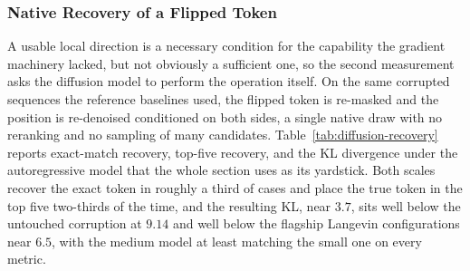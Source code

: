 \subsubsection{Native Recovery of a Flipped Token}
\label{sec:results-diffusion-recovery}

A usable local direction is a necessary condition for the capability the gradient machinery lacked, but not obviously a sufficient one, so the second measurement asks the diffusion model to perform the operation itself. On the same corrupted sequences the reference baselines used, the flipped token is re-masked and the position is re-denoised conditioned on both sides, a single native draw with no reranking and no sampling of many candidates. Table~\ref{tab:diffusion-recovery} reports exact-match recovery, top-five recovery, and the KL divergence under the autoregressive model that the whole section uses as its yardstick. Both scales recover the exact token in roughly a third of cases and place the true token in the top five two-thirds of the time, and the resulting KL, near $3.7$, sits well below the untouched corruption at $9.14$ and well below the flagship Langevin configurations near $6.5$, with the medium model at least matching the small one on every metric. %


